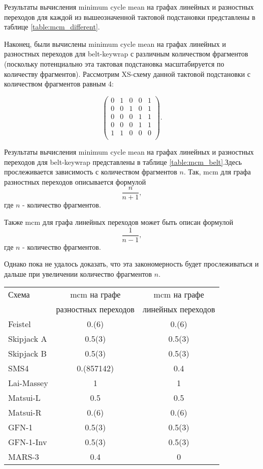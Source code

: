 \documentclass[a4paper,12pt]{report}
\makeatletter
\theoremstyle{plain} %
\theoremstyle{definition}
\theoremstyle{remark}
\renewenvironment{table}{%
\let\@makecaption\@maketablecaption
\@float{table}}%
{%
\addtocontents{lot}{ {\vskip 0.4em} }%
\end@float%
}
\newlength\abovetablecaptionskip
\newlength\belowtablecaptionskip
\newlength\tableparindent
\newcommand{\@maketablecaption}[2]{
  \vskip\abovetablecaptionskip
  \hskip\tableparindent \large #1~---\ \large #2\par
  \vskip\belowtablecaptionskip
}
\makeatother
\begin{document}
\begin{large}
Результаты вычисления minimum cycle mean на графах линейных и разностных переходов для каждой из вышеозначенной тактовой подстановки представлены в таблице \ref{table:mcm_different}.

Наконец, были вычислены minimum cycle mean на графах линейных и разностных переходов для belt-keywrap с различным количеством фрагментов (поскольку потенциально эта тактовая подстановка масштабируется по количеству фрагментов). Рассмотрим XS-схему данной тактовой подстановки с количеством фрагментов равным 4:

$$
\begin{pmatrix}
0 & 1 & 0 & 0 & 1\\
0 & 0 & 1 & 0 & 1\\
0 & 0 & 0 & 1 & 1\\
0 & 0 & 0 & 1 & 1\\
1 & 1 & 0 & 0 & 0\\
\end{pmatrix}.
$$

Результаты вычисления minimum cycle mean на графах линейных и разностных переходов для belt-keywrap представлены в таблице \ref{table:mcm_belt}.Здесь прослеживается зависимость с количеством фрагментов $n$. Так, mcm для графа разностных переходов описывается формулой $$\frac{n}{n+1},$$ где $n$ - количество фрагментов. 

Также mcm для графа линейных переходов может быть описан формулой $$\frac{1}{n-1},$$ где $n$ - количество фрагментов.

 Однако пока не удалось доказать, что эта закономерность будет прослеживаться и дальше при увеличении количество фрагментов $n$.

\begin{table}
\caption{Результаты вычисления minimum cycle mean на графах линейных и разностных переходов различных тактовых подстановок}
\label{table:mcm_different}
\begin{center}
\begin{tabular}{ l | c | c }
  \hline			
  Схема & mcm на графе & mcm на графе \\
   & разностных переходов & линейных переходов \\
\hline
  Feistel & 0.(6) & 0.(6) \\
  Skipjack A & 0.5(3) & 0.5(3) \\
  Skipjack B & 0.5(3) & 0.5(3) \\
  SMS4 & 0.(857142) & 0.4 \\
  Lai-Massey & 1& 1 \\
  Matsui-L & 0.5 & 0.5 \\
  Matsui-R & 0.(6) & 0.(6) \\
  GFN-1 & 0.5(3) & 0.5(3) \\
  GFN-1-Inv & 0.5(3) & 0.5(3)  \\
  MARS-3 & 0.4 & 0 \\
  \hline  
\end{tabular}
\end{center}
\end{table}


\end{large}
\end{document}
